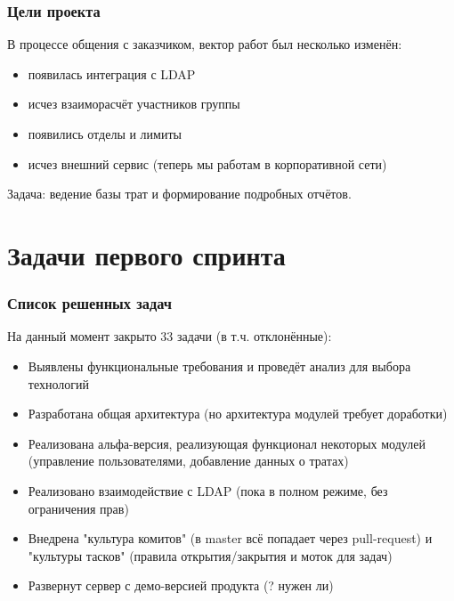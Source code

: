 \documentclass{beamer}
\newlength{\wideitemsep}
\let\olditem\item
\renewcommand{\item}{\setlength{\itemsep}{\wideitemsep}\olditem}
\begin{document}

\begin{frame}
\frametitle{Цели проекта}

В процессе общения с заказчиком, вектор работ был несколько изменён:

\begin{itemize}
\item появилась интеграция с LDAP
\item исчез взаиморасчёт участников группы
\item появились отделы и лимиты
\item исчез внешний сервис (теперь мы работам в корпоративной сети)
\end{itemize}
\bigskip
Задача: ведение базы трат и формирование подробных отчётов.

\end{frame}

\section{Задачи первого спринта}

\begin{frame}
\frametitle{Список решенных задач}

На данный момент закрыто 33 задачи (в т.ч. отклонённые):
\begin{itemize}
\item Выявлены функциональные требования и проведёт анализ для выбора технологий
\item Разработана общая архитектура (но архитектура модулей требует доработки)
\item Реализована альфа-версия, реализующая функционал некоторых модулей (управление пользователями, добавление данных о тратах)
\item Реализовано взаимодействие с LDAP (пока в полном режиме, без ограничения прав)
\item Внедрена "культура комитов" (в master всё попадает через pull-request) и "культуры тасков" (правила открытия/закрытия и моток для задач)
\item Развернут сервер с демо-версией продукта (? нужен ли)
\end{itemize}


\end{frame}

\end{document}
